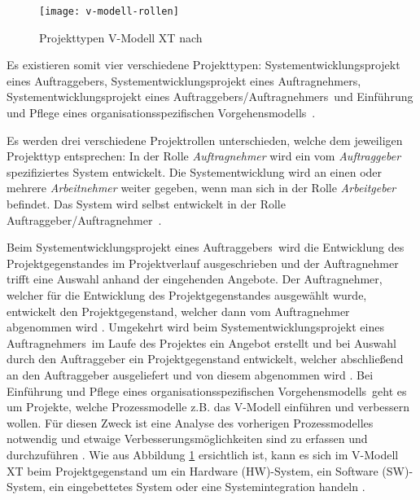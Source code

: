 \begin{figure}[htp]
\begin{center}
  \texttt{[image: v-modell-rollen]} %
  \caption{Projekttypen V-Modell XT nach \cite{2004vmodell}}
  \label{fig:Projekttypen}
\end{center}
\end{figure}

Es existieren somit vier verschiedene Projekttypen: \grqq Systementwicklungsprojekt eines Auftraggebers\grqq, \grqq Systementwicklungsprojekt eines Auftragnehmers\grqq, \grqq Systementwicklungsprojekt eines Auftraggebers/Auftragnehmers\grqq \ und \grqq Einführung und Pflege eines organisationsspezifischen Vorgehensmodells\grqq \ \cite{reinhard2008}. \newline

Es werden drei verschiedene Projektrollen unterschieden, welche dem jeweiligen Projekttyp entsprechen: In der Rolle \textit{Auftragnehmer} wird ein vom \textit{Auftraggeber} spezifiziertes System entwickelt. Die Systementwicklung wird an einen oder mehrere \textit{Arbeitnehmer} weiter gegeben, wenn man sich in der Rolle \textit{Arbeitgeber} befindet. Das System  wird selbst entwickelt in der Rolle \grqq Auftraggeber/Auftragnehmer\grqq \ \cite{brack2010,2004vmodell}.\newline


Beim \grqq Systementwicklungsprojekt eines Auftraggebers\grqq \ wird die Entwicklung des Projektgegenstandes im Projektverlauf  ausgeschrieben und der Auftragnehmer trifft eine Auswahl anhand der eingehenden Angebote. Der Auftragnehmer, welcher für die Entwicklung des Projektgegenstandes ausgewählt wurde, entwickelt den Projektgegenstand, welcher dann vom Auftragnehmer abgenommen wird \cite{reinhard2008,2004vmodell}.\newline
Umgekehrt wird beim \grqq Systementwicklungsprojekt eines Auftragnehmers\grqq \ im Laufe des Projektes ein Angebot erstellt und bei Auswahl durch den Auftraggeber ein Projektgegenstand entwickelt, welcher abschließend an den Auftraggeber ausgeliefert und von diesem abgenommen wird \cite{reinhard2008,2004vmodell}.\newline
Bei \grqq Einführung und Pflege eines organisationsspezifischen Vorgehensmodells\grqq \ geht es um Projekte, welche Prozessmodelle z.B. das V-Modell einführen und verbessern wollen. Für diesen Zweck ist eine Analyse des vorherigen Prozessmodelles notwendig und etwaige Verbesserungsmöglichkeiten sind zu erfassen und durchzuführen \cite{reinhard2008,2004vmodell}.\newline
Wie aus Abbildung \ref{fig:Projekttypen} ersichtlich ist, kann es sich im V-Modell XT beim Projektgegenstand um ein Hardware (HW)-System, ein Software (SW)-System, ein eingebettetes System oder eine Systemintegration handeln \cite{brack2010,2004vmodell}. \newline

